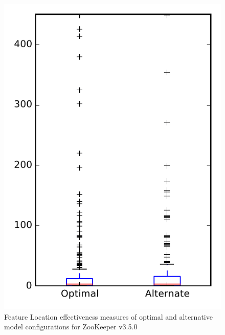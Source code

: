 
\begin{figure}
\centering
\includegraphics[height=0.4\textheight]{figures/combo/flt_rq1_zookeeper}
\caption{Feature Location effectiveness measures of optimal and alternative model configurations for ZooKeeper v3.5.0}
\label{fig:combo:flt:rq1:zookeeper}
\end{figure}
